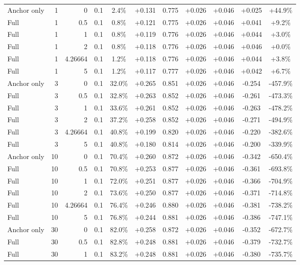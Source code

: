 \begin{table}[htbp]
\begin{tabular}{lrrrccccccc}
Anchor only & 1 & 0 & 0.1 & 2.4\% & +0.131 & 0.775 & +0.026 & +0.046 & +0.025 & +44.9\% \\
Full & 1 & 0.5 & 0.1 & 0.8\% & +0.121 & 0.775 & +0.026 & +0.046 & +0.041 & +9.2\% \\
Full & 1 & 1 & 0.1 & 0.8\% & +0.119 & 0.776 & +0.026 & +0.046 & +0.044 & +3.0\% \\
Full & 1 & 2 & 0.1 & 0.8\% & +0.118 & 0.776 & +0.026 & +0.046 & +0.046 & +0.0\% \\
Full & 1 & 4.26664 & 0.1 & 1.2\% & +0.118 & 0.776 & +0.026 & +0.046 & +0.044 & +3.8\% \\
Full & 1 & 5 & 0.1 & 1.2\% & +0.117 & 0.777 & +0.026 & +0.046 & +0.042 & +6.7\% \\
Anchor only & 3 & 0 & 0.1 & 32.0\% & +0.265 & 0.851 & +0.026 & +0.046 & -0.254 & -457.9\% \\
Full & 3 & 0.5 & 0.1 & 32.8\% & +0.263 & 0.852 & +0.026 & +0.046 & -0.261 & -473.3\% \\
Full & 3 & 1 & 0.1 & 33.6\% & +0.261 & 0.852 & +0.026 & +0.046 & -0.263 & -478.2\% \\
Full & 3 & 2 & 0.1 & 37.2\% & +0.258 & 0.852 & +0.026 & +0.046 & -0.271 & -494.9\% \\
Full & 3 & 4.26664 & 0.1 & 40.8\% & +0.199 & 0.820 & +0.026 & +0.046 & -0.220 & -382.6\% \\
Full & 3 & 5 & 0.1 & 40.8\% & +0.180 & 0.814 & +0.026 & +0.046 & -0.200 & -339.9\% \\
Anchor only & 10 & 0 & 0.1 & 70.4\% & +0.260 & 0.872 & +0.026 & +0.046 & -0.342 & -650.4\% \\
Full & 10 & 0.5 & 0.1 & 70.8\% & +0.253 & 0.877 & +0.026 & +0.046 & -0.361 & -693.8\% \\
Full & 10 & 1 & 0.1 & 72.0\% & +0.251 & 0.877 & +0.026 & +0.046 & -0.366 & -704.9\% \\
Full & 10 & 2 & 0.1 & 73.6\% & +0.250 & 0.877 & +0.026 & +0.046 & -0.371 & -714.8\% \\
Full & 10 & 4.26664 & 0.1 & 76.4\% & +0.246 & 0.880 & +0.026 & +0.046 & -0.381 & -738.2\% \\
Full & 10 & 5 & 0.1 & 76.8\% & +0.244 & 0.881 & +0.026 & +0.046 & -0.386 & -747.1\% \\
Anchor only & 30 & 0 & 0.1 & 82.0\% & +0.258 & 0.872 & +0.026 & +0.046 & -0.352 & -672.7\% \\
Full & 30 & 0.5 & 0.1 & 82.8\% & +0.248 & 0.881 & +0.026 & +0.046 & -0.379 & -732.7\% \\
Full & 30 & 1 & 0.1 & 83.2\% & +0.248 & 0.881 & +0.026 & +0.046 & -0.380 & -735.7\% \\

\end{tabular}
\end{table}
